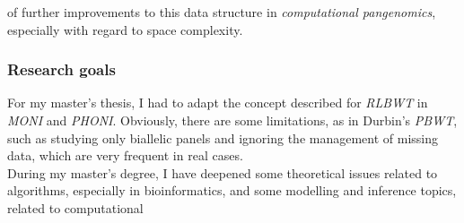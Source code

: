 \documentclass[a4paper,11pt, oneside]{article}
\begin{document}
of further improvements to this data structure in \textit{computational
  pangenomics}, especially with regard to space complexity. 
\subsubsection*{Research goals}
For my master's thesis, I had to adapt the concept described for
\textit{RLBWT} in \textit{MONI} and \textit{PHONI}. 
Obviously, there are some limitations, as in Durbin's \textit{PBWT}, such as
studying only biallelic panels and ignoring the management of missing data,
which are very frequent in real cases. \\
During my master’s degree, I have deepened some theoretical
issues related to algorithms, especially in bioinformatics, and
some modelling and inference topics, related to computational 
\end{document}
